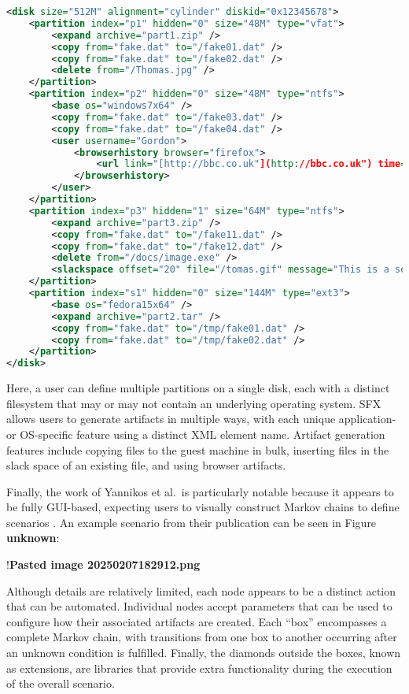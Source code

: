 \documentclass[letterpaper,12pt]{report}
\begin{document}
\begin{lstlisting}[language=XML]
<disk size="512M" alignment="cylinder" diskid="0x12345678">
    <partition index="p1" hidden="0" size="48M" type="vfat">
        <expand archive="part1.zip" />
        <copy from="fake.dat" to="/fake01.dat" />
        <copy from="fake.dat" to="/fake02.dat" />
        <delete from="/Thomas.jpg" />
    </partition>
    <partition index="p2" hidden="0" size="48M" type="ntfs">
        <base os="windows7x64" />
        <copy from="fake.dat" to="/fake03.dat" />
        <copy from="fake.dat" to="/fake04.dat" />
        <user username="Gordon">
            <browserhistory browser="firefox">
                <url link="[http://bbc.co.uk"](http://bbc.co.uk") time="13:14:00 1 Jan 2013" />
            </browserhistory>
        </user>
    </partition>
    <partition index="p3" hidden="1" size="64M" type="ntfs">
        <expand archive="part3.zip" />
        <copy from="fake.dat" to="/fake11.dat" />
        <copy from="fake.dat" to="/fake12.dat" />
        <delete from="/docs/image.exe" />
        <slackspace offset="20" file="/tomas.gif" message="This is a secret message" />
    </partition>
    <partition index="s1" hidden="0" size="144M" type="ext3">
        <base os="fedora15x64" />
        <expand archive="part2.tar" />
        <copy from="fake.dat" to="/tmp/fake01.dat" />
        <copy from="fake.dat" to="/tmp/fake02.dat" />
    </partition>
</disk>
\end{lstlisting}

Here, a user can define multiple partitions on a single disk, each with
a distinct filesystem that may or may not contain an underlying
operating system. SFX allows users to generate artifacts in multiple
ways, with each unique application- or OS-specific feature using a
distinct XML element name. Artifact generation features include copying
files to the guest machine in bulk, inserting files in the slack space
of an existing file, and using browser artifacts.

Finally, the work of Yannikos et al.~is particularly notable because it
appears to be fully GUI-based, expecting users to visually construct
Markov chains to define scenarios
\cite{yannikosDataCorporaDigital2014}. An example scenario from
their publication can be seen in Figure \textbf{unknown}:

!\textbf{Pasted image 20250207182912.png}

Although details are relatively limited, each node appears to be a
distinct action that can be automated. Individual nodes accept
parameters that can be used to configure how their associated artifacts
are created. Each ``box'' encompasses a complete Markov chain, with
transitions from one box to another occurring after an unknown condition
is fulfilled. Finally, the diamonds outside the boxes, known as
extensions, are libraries that provide extra functionality during the
execution of the overall scenario.
\end{document}

